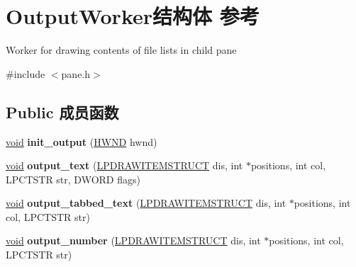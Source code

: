 \hypertarget{struct_output_worker}{}\section{Output\+Worker结构体 参考}
\label{struct_output_worker}


Worker for drawing contents of file lists in child pane  




{\ttfamily \#include $<$pane.\+h$>$}

\subsection*{Public 成员函数}
\begin{DoxyCompactItemize}
\item 
\mbox{\label{struct_output_worker_a4ddfd4aa63abf365e73b74ffb18b2abd}} 
\hyperlink{interfacevoid}{void} {\bfseries init\+\_\+output} (\hyperlink{interfacevoid}{H\+W\+ND} hwnd)
\item 
\mbox{\label{struct_output_worker_a4dc18aa528e64d97bd243c7beb433a4c}} 
\hyperlink{interfacevoid}{void} {\bfseries output\+\_\+text} (\hyperlink{structtag_d_r_a_w_i_t_e_m_s_t_r_u_c_t}{L\+P\+D\+R\+A\+W\+I\+T\+E\+M\+S\+T\+R\+U\+CT} dis, int $\ast$positions, int col, L\+P\+C\+T\+S\+TR str, D\+W\+O\+RD flags)
\item 
\mbox{\label{struct_output_worker_ad617125325b2a87d48391ceacda591e5}} 
\hyperlink{interfacevoid}{void} {\bfseries output\+\_\+tabbed\+\_\+text} (\hyperlink{structtag_d_r_a_w_i_t_e_m_s_t_r_u_c_t}{L\+P\+D\+R\+A\+W\+I\+T\+E\+M\+S\+T\+R\+U\+CT} dis, int $\ast$positions, int col, L\+P\+C\+T\+S\+TR str)
\item 
\mbox{\label{struct_output_worker_a17c7d0def47359b6c9cbd5b0bbee3d0e}} 
\hyperlink{interfacevoid}{void} {\bfseries output\+\_\+number} (\hyperlink{structtag_d_r_a_w_i_t_e_m_s_t_r_u_c_t}{L\+P\+D\+R\+A\+W\+I\+T\+E\+M\+S\+T\+R\+U\+CT} dis, int $\ast$positions, int col, L\+P\+C\+T\+S\+TR str)
\end{DoxyCompactItemize}
